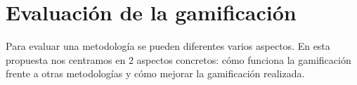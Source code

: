 


\section{Evaluación de la gamificación}


Para evaluar una metodología se pueden diferentes varios aspectos.
%
En esta propuesta nos centramos en 2 aspectos concretos:
%
cómo funciona la gamificación frente a otras metodologías y cómo mejorar la  gamificación realizada.

